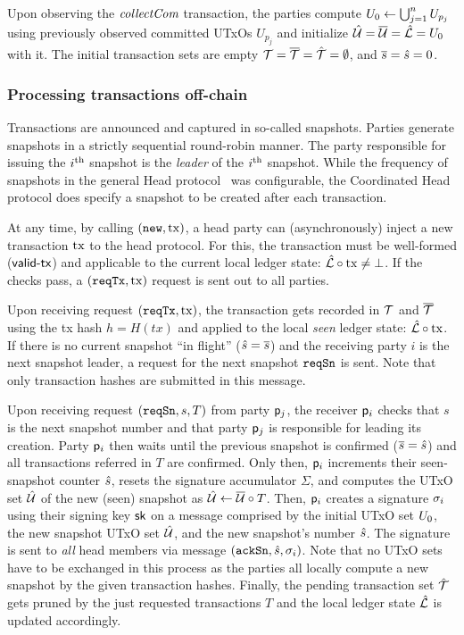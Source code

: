 \quad Upon observing the $\textit{collectCom}$ transaction, the parties compute $U_{0} \gets \bigcup_{j=1}^{n} U_{p_j}$ using previously observed committed UTxOs $U_{p_j}$ and initialize $\hat {\mathcal U} = \overline {\mathcal U} = \hat {\mathcal L} = U_{0}$ with it. The initial transaction sets are empty ${\mathcal T} = \overline {\mathcal T} =\hat {\mathcal T} =\emptyset$, and $\overline s = \hat s = 0$.

\subsubsection{Processing transactions off-chain}

Transactions are announced and captured in so-called snapshots. Parties generate
snapshots in a strictly sequential round-robin manner. The party responsible for
issuing the $i^{\text{th}}$ snapshot is the \emph{leader} of the $i^{\text{th}}$ snapshot.
While the frequency of snapshots in the general Head protocol~\cite{hydrahead20}
was configurable, the Coordinated Head protocol does specify a snapshot to be
created after each transaction.

\quad At any time, by calling $(\mathtt{new},\mathrm{tx})$, a head
party can (asynchronously) inject a new transaction $\mathrm{tx}$ to the head protocol.
For this, the transaction must be well-formed ($\mathsf{valid\textsf{-}{}tx}$) and applicable to the
current local ledger state: $\hat {\mathcal L} \circ \mathrm{tx} \neq \bot$. If the checks
pass, a $(\mathtt{reqTx},\mathrm{tx})$ request is sent out to all parties.

\quad Upon receiving request $(\mathtt{reqTx},\mathrm{tx})$, the transaction
gets recorded in ${\mathcal T}$ and $\overline {\mathcal T}$ using the tx hash $h = H(tx)$ and applied
to the local \emph{seen} ledger state: $\hat {\mathcal L} \circ \mathrm{tx}$. If there is no
current snapshot ``in flight'' ($\hat s = \overline s$) and the receiving party $i$ is
the next snapshot leader, a request for the next snapshot $\mathtt{reqSn}$ is sent. Note that only transaction hashes are submitted in this message.

\quad Upon receiving request $(\mathtt{reqSn},s,T)$ from party
$\mathsf p_j$, the receiver $\mathsf p_i$ checks that $s$ is the next snapshot number
and that party $\mathsf p_j$ is responsible for leading its creation. Party
$\mathsf p_i$ then waits until the previous snapshot is confirmed ($\overline s = \hat s$)
and all transactions referred in $T$  are
confirmed. Only then, $\mathsf p_i$ increments their seen-snapshot counter $\hat s$,
resets the signature accumulator $\Sigma$, and computes the UTxO set $\hat {\mathcal U}$ of
the new (seen) snapshot as $\hat {\mathcal U} \gets \overline {\mathcal U} \circ T$. Then, $\mathsf p_i$
creates a signature $\sigma_i$ using their signing key $\mathsf{sk}$ on a message
comprised by the initial UTxO set $U_{0}$, the new snapshot UTxO set $\hat {\mathcal U}$,
and the new snapshot's number $\hat s$. The signature is sent to \emph{all} head
members via message $(\mathtt{ackSn},\hat s,\sigma_i)$. Note that no UTxO sets have to be
exchanged in this process as the parties all locally compute a new snapshot by
the given transaction hashes. Finally, the pending transaction set $\hat {\mathcal T}$ gets
pruned by the just requested transactions $T$ and the local ledger state
$\hat {\mathcal L}$ is updated accordingly.

